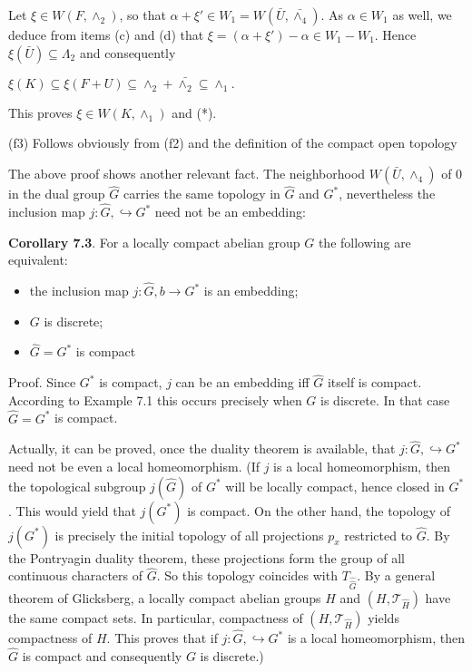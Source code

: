 \documentclass[12pt]{article}
\begin{document}
    Let $\xi \in W(F,\wedge_2)$, so that $\alpha + \xi' \in W_1 = W(\bar{U},\bar{\wedge_4})$. As $\alpha \in W_1$ as well, we deduce from items (c) and (d) that
$\xi = (\alpha + \xi') - \alpha \in W_1 - W_1$. Hence $\xi(\bar{U}) \subseteq Λ_2$ and consequently
    

    $\xi(K) \subseteq \xi(F + U) \subseteq \wedge_2 + \bar{\wedge_2} \subseteq \wedge_1.$


This proves $\xi \in W(K,\wedge_1)$ and (*).


    (f3) Follows obviously from (f2) and the definition of the compact open topology


    The above proof shows another relevant fact. The neighborhood $W(\bar{U},\wedge_4)$ of 0 in the dual group $\hat{G}$ carries
the same topology in $\hat{G}$ and $G^*$, nevertheless the inclusion map $j : \hat{G} , \hookrightarrow G^*$ need not be an embedding:
    

\textbf{Corollary 7.3}. For a locally compact abelian group $G$ the following are equivalent:


    \begin{itemize}

        \item the inclusion map $j : \hat{G} , b \to G^*$ is an embedding;

        \item $G$ is discrete;

        \item $\hat{G} = G^*$ is compact

    \end{itemize}


Proof. Since $G^*$ is compact, $j$ can be an embedding iff $\hat{G}$ itself is compact. According to Example 7.1 this
occurs precisely when $G$ is discrete. In that case $\hat{G} = G^*$ is compact.


    Actually, it can be proved, once the duality theorem is available, that $j : \hat{G}, \hookrightarrow G^*$ need not be even a local
homeomorphism. (If $j$ is a local homeomorphism, then the topological subgroup $j(\hat{G})$ of $G^*$ will be locally
compact, hence closed in $G^*$. This would yield that $j(G^*)$ is compact. On the other hand, the topology of
$j(G^*)$ is precisely the initial topology of all projections $p_x$ restricted to $\hat{G}$. By the Pontryagin duality theorem,
these projections form the group of all continuous characters of $\hat{G}$. So this topology coincides with $T_{\hat{\hat{G}}}$. By a
general theorem of Glicksberg, a locally compact abelian groups $H$ and $(H, \mathcal{T}_{\hat{H}})$ have the same compact sets.
In particular, compactness of $(H, \mathcal{T}_{\hat{H}})$ yields compactness of $H$. This proves that if $j : \hat{G}, \hookrightarrow G^*$ is a local
homeomorphism, then $\hat{G}$ is compact and consequently $G$ is discrete.)
\end{document}
